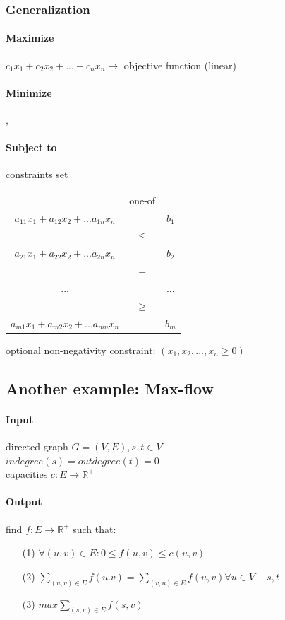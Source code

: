 \subsubsection{Generalization}
\paragraph{Maximize} $c_1x_1 + c_2x_2 + ... + c_nx_n \rightarrow$ objective function (linear)
\paragraph{Minimize} \phantom, 
\paragraph{Subject to} constraints set \\
\begin{center}
\begin{tabular}{c|c|c}
	& one-of & \\
	$a_{11}x_1+a_{12}x_2+...a_{1n}x_n$ &  & $b_1$ \\ 
	& $\leq$ & \\
	$a_{21}x_1+a_{22}x_2+...a_{2n}x_n$ & & $b_2$ \\
	& $=$ & \\
	... & & ... \\
	& $\geq$ & \\
	$a_{m1}x_1+a_{m2}x_2+...a_{mn}x_n$ & & $b_m$ \\
\end{tabular}
\end{center}
optional non-negativity constraint: $(x_1,x_2,...,x_n \geq 0)$ 
\subsection{Another example: Max-flow}
\paragraph{Input} directed graph $G=(V,E),s,t \in V$ \\
$indegree(s) = outdegree(t) = 0$ \\
capacities $c: E \rightarrow \mathbb{R}^+$
\paragraph{Output} find $f: E \rightarrow \mathbb{R}^+$ such that:
\begin{itemize}
	\item[(1)] $\forall(u,v) \in E: 0 \leq f(u,v) \leq c(u,v)$
	\item[(2)] $\sum_{(u,v) \in E}f(u.v) = \sum_{(v,u) \in E}f(u,v) \forall u \in V-{s,t}$
	\item[(3)] $max \sum_{(s,v) \in E}f(s,v)$
\end{itemize}
